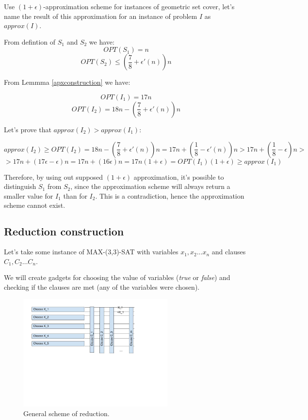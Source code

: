 Use $(1+\epsilon)$-approximation scheme for instances of geometric
set cover, let's name the result of this approximation
for an instance of problem $I$ as $approx(I)$.

From defintion of $S_1$ and $S_2$ we have:
$$OPT(S_1) = n$$
$$OPT(S_2) \le (\frac{7}{8} + \epsilon'(n))n$$

From Lemmma \ref{apxconstruction} we have:

$$OPT(I_1) = 17n$$
$$OPT(I_2) = 18n - (\frac{7}{8} + \epsilon'(n))n$$

Let's prove that $approx(I_2) > approx(I_1)$:

$$approx(I_2) \ge OPT(I_2) = 18n - (\frac{7}{8} + \epsilon'(n))n
	= 17n + (\frac{1}{8} - \epsilon'(n))n
	> 17n + (\frac{1}{8} - \epsilon)n > $$
$$	> 17n + (17\epsilon - \epsilon)n
	= 17n + (16\epsilon)n
	= 17n(1+\epsilon)
	= OPT(I_1)(1+\epsilon) \ge approx(I_1)$$ 



Therefore, by using out supposed $(1+\epsilon)$ approximation,
it’s possible to distinguish $S_1$ from $S_2$, since
the approximation scheme will always return a smaller value
for $I_1$ than for $I_2$. This is a contradiction,
hence the approximation scheme cannot exist.

\subsection{Reduction construction}
\label{reduction_construction}

Let's take some instance of  MAX-(3,3)-SAT with
variables $x_1, x_2 \ldots x_n$
and clauses $C_1, C_2 \dots C_n$.

We will create gadgets for choosing the value
of variables (\textit{true} or \textit{false}) and checking
if the clauses are met (any of the variables were chosen).

\begin{figure}[h]
\includegraphics[width=0.7\textwidth]{segment_apx_sketch.jpg}
\caption{General scheme of reduction.}
\label{fig:segment_apx}
\end{figure}

